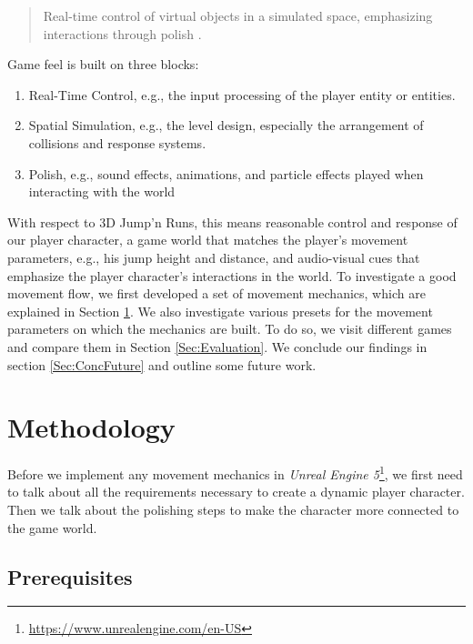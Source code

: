 \documentclass[letterpaper, 10 pt, conference]{ieeeconf}  %
\begin{document}
\begin{quote}
    Real-time control of virtual objects in a simulated space, emphasizing interactions through polish \cite{swink2008game}.
\end{quote}

Game feel is built on three blocks:

\begin{enumerate}
    \item Real-Time Control, e.g., the input processing of the player entity or entities.
    \item Spatial Simulation, e.g., the level design, especially the arrangement of collisions and response systems.
    \item Polish, e.g., sound effects, animations, and particle effects played when interacting with the world
\end{enumerate}

With respect to 3D Jump'n Runs, this means reasonable control and response of our player character, a game world that matches the player's movement parameters, e.g., his jump height and distance, and audio-visual cues that emphasize the player character's interactions in the world.
To investigate a good movement flow, we first developed a set of movement mechanics, which are explained in Section \ref{Sec:Met}.
We also investigate various presets for the movement parameters on which the mechanics are built.
To do so, we visit different games and compare them in Section \ref{Sec:Evaluation}.
We conclude our findings in section \ref{Sec:ConcFuture} and outline some future work.

\section{Methodology}
\label{Sec:Met}

Before we implement any movement mechanics in \textit{Unreal Engine 5}\footnote{\url{https://www.unrealengine.com/en-US}}, we first need to talk about all the requirements necessary to create a dynamic player character.
Then we talk about the polishing steps to make the character more connected to the game world.

\subsection{Prerequisites}
\end{document}
